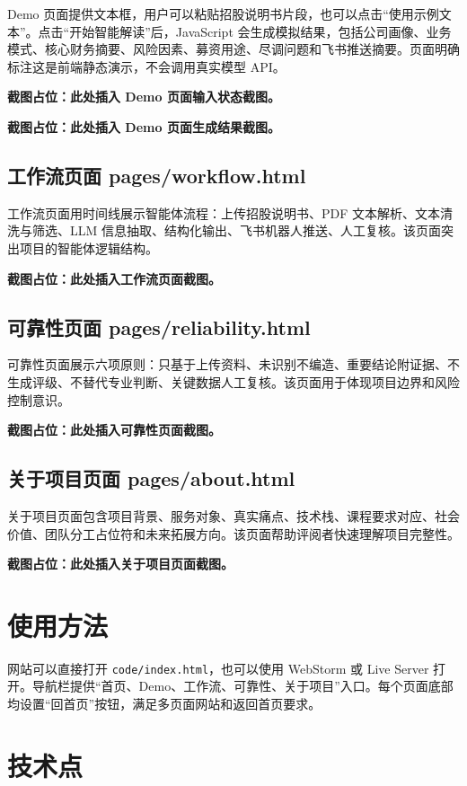 \documentclass[UTF8,a4paper,12pt]{ctexart}
\begin{document}
Demo 页面提供文本框，用户可以粘贴招股说明书片段，也可以点击“使用示例文本”。点击“开始智能解读”后，JavaScript 会生成模拟结果，包括公司画像、业务模式、核心财务摘要、风险因素、募资用途、尽调问题和飞书推送摘要。页面明确标注这是前端静态演示，不会调用真实模型 API。

\textbf{截图占位：此处插入 Demo 页面输入状态截图。}

\textbf{截图占位：此处插入 Demo 页面生成结果截图。}

\subsection{工作流页面 pages/workflow.html}

工作流页面用时间线展示智能体流程：上传招股说明书、PDF 文本解析、文本清洗与筛选、LLM 信息抽取、结构化输出、飞书机器人推送、人工复核。该页面突出项目的智能体逻辑结构。

\textbf{截图占位：此处插入工作流页面截图。}

\subsection{可靠性页面 pages/reliability.html}

可靠性页面展示六项原则：只基于上传资料、未识别不编造、重要结论附证据、不生成评级、不替代专业判断、关键数据人工复核。该页面用于体现项目边界和风险控制意识。

\textbf{截图占位：此处插入可靠性页面截图。}

\subsection{关于项目页面 pages/about.html}

关于项目页面包含项目背景、服务对象、真实痛点、技术栈、课程要求对应、社会价值、团队分工占位符和未来拓展方向。该页面帮助评阅者快速理解项目完整性。

\textbf{截图占位：此处插入关于项目页面截图。}

\section{使用方法}

网站可以直接打开 \texttt{code/index.html}，也可以使用 WebStorm 或 Live Server 打开。导航栏提供“首页、Demo、工作流、可靠性、关于项目”入口。每个页面底部均设置“回首页”按钮，满足多页面网站和返回首页要求。

\section{技术点}
\end{document}
